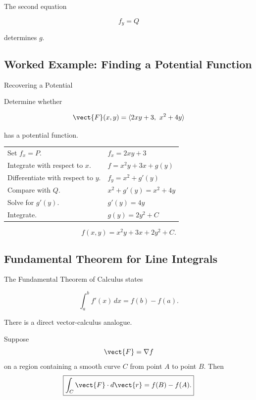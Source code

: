 The second equation

\[ f_y=Q \]

determines \(g\).

\subsection{Worked Example: Finding a Potential Function}
\label{subsec:worked-potential-function}

\begin{workedexamplebox}{Recovering a Potential}

Determine whether

\[ \vect{F}(x,y)=\langle2xy+3,\ x^2+4y\rangle \]

has a potential function.

\begin{tabularx}{\textwidth}{@{}>{\raggedright\arraybackslash}p{}X@{}}
Set \(f_x=P\). &
\(f_x=2xy+3\)\\
Integrate with respect to \(x\). &
\(f=x^2y+3x+g(y)\)\\
Differentiate with respect to \(y\). &
\(f_y=x^2+g'(y)\)\\
Compare with \(Q\). &
\(x^2+g'(y)=x^2+4y\)\\
Solve for \(g'(y)\). &
\(g'(y)=4y\)\\
Integrate. &
\(g(y)=2y^2+C\)
\end{tabularx}

\begin{answerbox}
\[ \boxed{f(x,y)=x^2y+3x+2y^2+C.} \]
\end{answerbox}
\end{workedexamplebox}

\subsection{Fundamental Theorem for Line Integrals}
\label{subsec:fundamental-theorem-line-integrals}

The Fundamental Theorem of Calculus states

\[ \int_a^b f'(x)\,dx=f(b)-f(a). \]

There is a direct vector-calculus analogue.

\begin{theorem}
Suppose
\[ \vect{F}=\nabla f \]
on a region containing a smooth curve \(C\) from point \(A\) to point \(B\).
Then
\[ \boxed{\int_C\vect{F}\cdot d\vect{r}=f(B)-f(A).} \]
\end{theorem}

